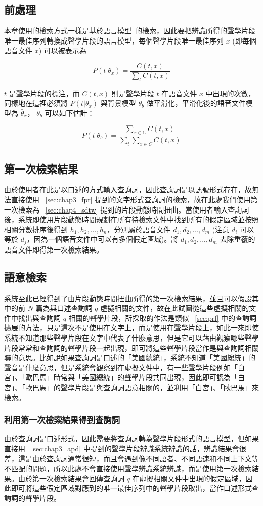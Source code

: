 \subsection{前處理}
本章使用的檢索方式一樣是基於語言模型~\cite{chia2010statistical}的檢索，因此要把辨識所得的聲學片段唯一最佳序列轉換成聲學片段的語言模型，每個聲學片段唯一最佳序列 $x$ (即每個語音文件 $x$) 可以被表示為

\[
P(t|\theta_x) = \frac{C(t, x)}{\sum_t C(t, x)}
\]

$t$ 是聲學片段的標注，而 $C(t, x)$ 則是聲學片段 $t$ 在語音文件 $x$ 中出現的次數，同樣地在這裡必須將 $P(t|\theta_x)$ 與背景模型 $\theta_b$ 做平滑化，平滑化後的語音文件模型為 $\bar{\theta}_x$， $\theta_b$ 可以如下估計：

\[
P(t|\theta_b) = \frac{\sum_{x \in C} C(t, x)}{\sum_t \sum_{x \in C} C(t, x)}
\]

\subsection{第一次檢索結果}
由於使用者在此是以口述的方式輸入查詢詞，因此查詢詞是以訊號形式存在，故無法直接使用 ~\ref{sec:chap3_fpr} 提到的文字形式查詢詞的檢索，故在此處我們使用第一次檢索為 ~\ref{sec:chap4_sdtw} 提到的片段動態時間扭曲。當使用者輸入查詢詞後，系統即使用片段動態時間規劃在所有待檢索文件中找到所有的假定區域並按照相關分數排序後得到 $h_1, h_2, ...,h_n$，分別屬於語音文件 $d_1, d_2, ..., d_m$ (注意 $d_i$ 可以等於 $d_j$，因為一個語音文件中可以有多個假定區域)。將 $d_1, d_2, ..., d_m$ 去除重覆的語音文件即得第一次檢索結果。

\subsection{語意檢索}
系統至此已經得到了由片段動態時間扭曲所得的第一次檢索結果，並且可以假設其中的前 $N$ 篇為與口述查詢詞 $q$ 虛擬相關的文件，故在此試圖從這些虛擬相關的文件中找出與查詢詞 $q$ 相關的聲學片段，所採取的作法是類似 ~\ref{sec:prf}
中的查詢詞擴展的方法，只是這次不是使用在文字上，而是使用在聲學片段上，如此一來即使系統不知道那些聲學片段在文字中代表了什麼意思，但是它可以藉由觀察哪些聲學片段常常和查詢詞的聲學片段一起出現，即可將這些聲學片段當作是與查詢詞相關聯的意思。比如說如果查詢詞是口述的「美國總統」，系統不知道「美國總統」的聲音是什麼意思，但是系統會觀察到在虛擬文件中，有一些聲學片段例如「白宮」、「歐巴馬」時常與「美國總統」的聲學片段共同出現，因此即可認為「白宮」、「歐巴馬」的聲學片段是與查詢詞語意相關的，並利用「白宮」、「歐巴馬」來檢索。

\subsubsection{利用第一次檢索結果得到查詢詞}
\label{sec:chap4_decode_query}
由於查詢詞是口述形式，因此需要將查詢詞轉為聲學片段形式的語言模型，但如果直接用 ~\ref{sec:chap3_apd} 中提到的聲學片段辨識系統辨識的話，辨識結果會很差，這是由於查詢詞通常很短，而且會遇到像不同語者、不同語速和不同上下文等不匹配的問題，所以此處不會直接使用聲學辨識系統辨識，而是使用第一次檢索結果。由於第一次檢索結果會回傳查詢詞 $q$ 在虛擬相關文件中出現的假定區域，因此即可將這些假定區域對應到的唯一最佳序列中的聲學片段取出，當作口述形式查詢詞的聲學片段。

